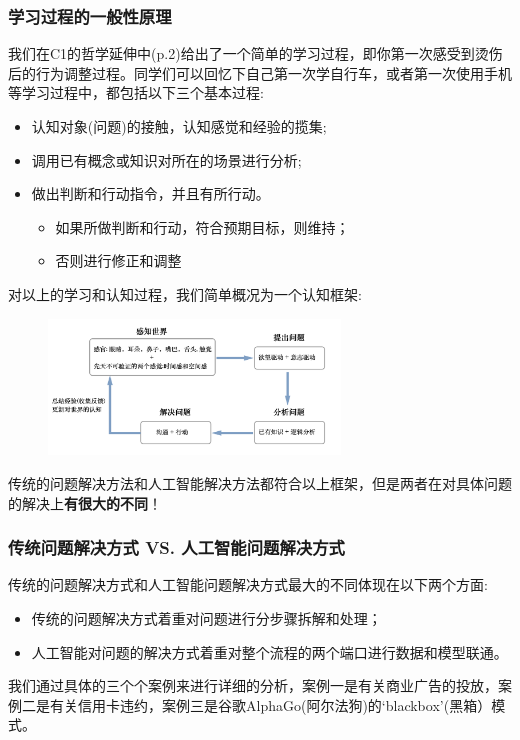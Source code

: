 \documentclass[12pt]{article}
\newenvironment{fullmodel}{
			\smallskip\noindent
			\begin{minipage}{\textwidth+\marginparwidth+\marginparsep}\smallskip\smallskip}
			{\smallskip\smallskip\end{minipage}\vspace{.1in}
			}
\numberwithin{equation}{section}
\numberwithin{figure}{section}
\begin{document}
\subsubsection{学习过程的一般性原理}

\begin{fullmodel}
	我们在C1的哲学延伸中(p.2)给出了一个简单的学习过程，即你第一次感受到烫伤后的行为调整过程。同学们可以回忆下自己第一次学自行车，或者第一次使用手机等学习过程中，都包括以下三个基本过程:
	\begin{itemize}
		\item 认知对象(问题)的接触，认知感觉和经验的揽集;
		\item 调用已有概念或知识对所在的场景进行分析;
		\item 做出判断和行动指令，并且有所行动。\begin{itemize}
		\item 如果所做判断和行动，符合预期目标，则维持；
		\item 否则进行修正和调整
		\end{itemize}
	\end{itemize}
	
对以上的学习和认知过程，我们简单概况为一个认知框架:
\begin{figure}[H]
	\centering
	\includegraphics[width=0.69\textwidth]{fig/epismeflow}
\end{figure}

传统的问题解决方法和人工智能解决方法都符合以上框架，但是两者在对具体问题的解决上\textbf{有很大的不同}！
\end{fullmodel}

\subsubsection{传统问题解决方式 VS. 人工智能问题解决方式}

传统的问题解决方式和人工智能问题解决方式最大的不同体现在以下两个方面:
	\begin{itemize}
		\item 传统的问题解决方式着重对问题进行分步骤拆解和处理；
		\item 人工智能对问题的解决方式着重对整个流程的两个端口进行数据和模型联通。
	\end{itemize}
我们通过具体的三个个案例来进行详细的分析，案例一是有关商业广告的投放，案例二是有关信用卡违约，案例三是谷歌AlphaGo(阿尔法狗)的`blackbox'(黑箱）模式。
\end{document}

